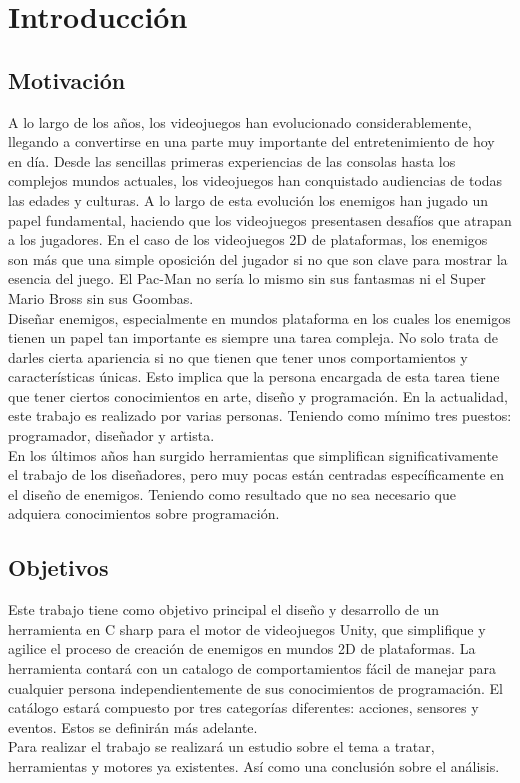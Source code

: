 \chapter{Introducción}
\label{cap:introduccion}


\section{Motivación}
A lo largo de los años, los videojuegos han evolucionado considerablemente, llegando a convertirse en una parte muy importante del entretenimiento de hoy en día. Desde las sencillas primeras experiencias de las consolas hasta los complejos mundos actuales, los videojuegos han conquistado audiencias de todas las edades y culturas. A lo largo de esta evolución los enemigos han jugado un papel fundamental, haciendo que los videojuegos presentasen desafíos que atrapan a los jugadores. 
En el caso de los videojuegos 2D de plataformas, los enemigos son más que una simple oposición del jugador si no que son clave para mostrar la esencia del juego. El Pac-Man no sería lo mismo sin sus fantasmas ni el Super Mario Bross sin sus Goombas. \\
Diseñar enemigos, especialmente en mundos plataforma en los cuales los enemigos tienen un papel tan importante es siempre una tarea compleja. No solo trata de darles cierta apariencia si no que tienen que tener unos comportamientos y características únicas.  Esto implica que la persona encargada de esta tarea tiene que tener ciertos conocimientos en arte, diseño y programación. En la actualidad, este trabajo es realizado por varias personas. Teniendo como mínimo tres puestos: programador, diseñador y artista. \\
En los últimos años han surgido herramientas que simplifican significativamente el trabajo de los diseñadores, pero muy pocas están centradas específicamente en el diseño de enemigos. Teniendo como resultado que no sea necesario que adquiera conocimientos sobre programación. 


\section{Objetivos}
Este trabajo tiene como objetivo principal el diseño y desarrollo de un herramienta en C sharp para el motor de videojuegos Unity, que simplifique y agilice el proceso  de creación de enemigos en mundos 2D de plataformas. La herramienta contará con un catalogo de comportamientos fácil de manejar para cualquier persona independientemente de sus conocimientos de programación. El catálogo estará compuesto por tres categorías diferentes: acciones, sensores y eventos. Estos se definirán más adelante. \\
Para realizar el trabajo se realizará un estudio sobre el tema a tratar,  herramientas y motores ya existentes. Así como una conclusión sobre el análisis.


